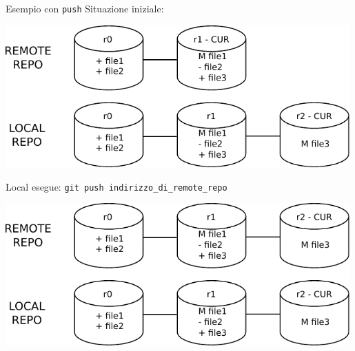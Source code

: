 \documentclass[xcolor=dvipsnames,presentation]{beamer}
\begin{document}
\begin{frame}{Esempio con \texttt{push}}
	Situazione iniziale:
	\begin{center}
		\includegraphics[width=0.99\textwidth]{img/draw5}
	\end{center}
	\framebreak{}
	Local esegue: \texttt{git push indirizzo\_di\_remote\_repo}
	\begin{center}
		\includegraphics[width=0.99\textwidth]{img/draw6}
	\end{center}
\end{frame}
\end{document}
